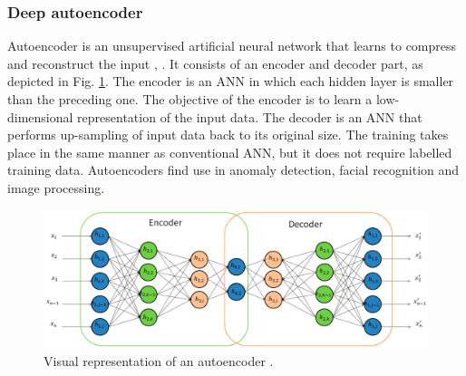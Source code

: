 \documentclass[conference, 11pt]{IEEEtran}
\begin{document}
    \subsubsection{Deep autoencoder}
    Autoencoder is an unsupervised artificial neural network that learns to compress and reconstruct the input \cite{ballard1987modular}, \cite{rumelhart1985learning}.
    It consists of an encoder and decoder part, as depicted in Fig. \ref{fig:ae}.
    The encoder is an ANN in which each hidden layer is smaller than the preceding one.
    The objective of the encoder is to learn a low-dimensional representation of the input data.
    The decoder is an ANN that performs up-sampling of input data back to its original size.
    The training takes place in the same manner as conventional ANN, but it does not require labelled training data.
    Autoencoders find use in anomaly detection, facial recognition and image processing.

    \begin{figure}[htbp]
        \centerline{\includegraphics[width=\linewidth]{figures/ae.jpg}}
        \caption{Visual representation of an autoencoder \cite{article:18}.}
        \label{fig:ae}
    \end{figure}
\end{document}
